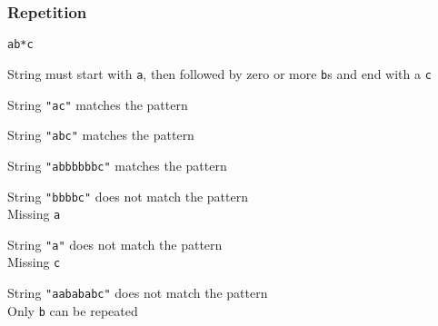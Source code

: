 \begin{frame}
  \frametitle{Repetition}
  \begin{center}
    \texttt{ab*c}
  \end{center}
  \begin{center}
    String must start with \texttt{a}, then followed by zero or more \texttt{b}s and end with a \texttt{c}
  \end{center}
  \begin{overprint}
    \begin{center}
      String \texttt{"ac"} matches the pattern \\[2mm]
    \end{center}

    \begin{center}
      String \texttt{"abc"} matches the pattern \\[2mm]
    \end{center}

    \begin{center}
      String \texttt{"abbbbbbc"} matches the pattern \\[2mm]
    \end{center}

    \begin{center}
      String \texttt{"bbbbc"} does not match the pattern \\[2mm]
      Missing \texttt{a}
    \end{center}

    \begin{center}
      String \texttt{"a"} does not match the pattern \\[2mm]
      Missing \texttt{c}
    \end{center}

    \begin{center}
      String \texttt{"aabababc"} does not match the pattern \\[2mm]
      Only \texttt{b} can be repeated
    \end{center}
  \end{overprint}
\end{frame}

